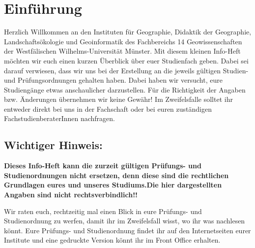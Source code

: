\chapter{Einführung}
Herzlich Willkommen an den Instituten für Geographie, Didaktik der Geographie, Landschaftsökologie und Geoinformatik des Fachbereichs 14 Geowissenschaften der Westfälischen Wilhelms-Universität Münster. Mit diesem kleinen Info-Heft möchten wir euch einen kurzen Überblick über euer Studienfach geben. Dabei sei darauf verwiesen, dass wir uns bei der Erstellung an die jeweils gültigen Studien- und Prüfungsordnungen gehalten haben. Dabei haben wir versucht, eure Studiengänge etwas anschaulicher darzustellen. Für die Richtigkeit der Angaben bzw. Änderungen übernehmen wir keine Gewähr! Im Zweifelsfalle solltet ihr entweder direkt bei uns in der Fachschaft oder bei euren zuständigen FachstudienberaterInnen nachfragen.

\section*{Wichtiger Hinweis:}
\textbf{Dieses Info-Heft kann die zurzeit gültigen Prüfungs- und Studienordnungen nicht ersetzen, denn diese sind die rechtlichen Grundlagen eures und unseres Studiums.\newline Die hier dargestellten Angaben sind nicht rechtsverbindlich!!}

Wir raten euch, rechtzeitig mal einen Blick in eure Prüfungs- und Studienordnung zu werfen, damit ihr im Zweifelsfall wisst, wo ihr was nachlesen könnt. Eure Prüfungs- und Studienordnung findet ihr auf den Internetseiten eurer Institute und eine gedruckte Version könnt ihr im Front Office erhalten.

